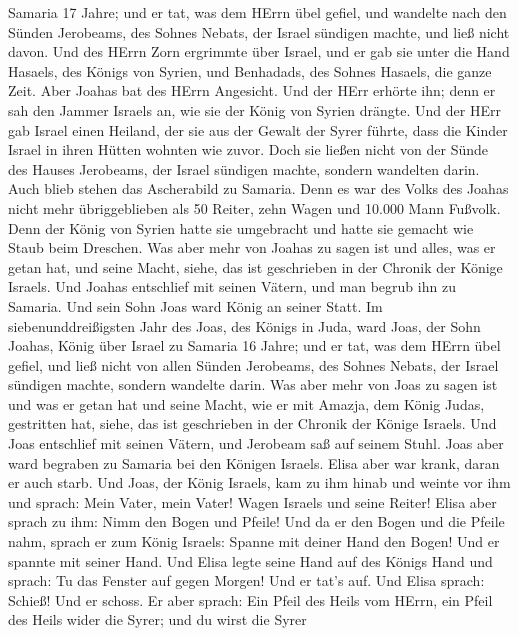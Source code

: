 Samaria 17 Jahre;  und er tat, was dem HErrn übel gefiel,
und wandelte nach den Sünden Jerobeams, des Sohnes Nebats, der Israel
sündigen machte, und ließ nicht davon.  Und des HErrn Zorn
ergrimmte über Israel, und er gab sie unter die Hand Hasaels, des Königs
von Syrien, und Benhadads, des Sohnes Hasaels, die ganze Zeit.
 Aber Joahas bat des HErrn Angesicht. Und der HErr erhörte
ihn; denn er sah den Jammer Israels an, wie sie der König von Syrien
drängte.  Und der HErr gab Israel einen Heiland, der sie aus
der Gewalt der Syrer führte, dass die Kinder Israel in ihren Hütten
wohnten wie zuvor.  Doch sie ließen nicht von der Sünde des
Hauses Jerobeams, der Israel sündigen machte, sondern wandelten darin.
Auch blieb stehen das Ascherabild zu Samaria.  Denn es war
des Volks des Joahas nicht mehr übriggeblieben als 50 Reiter, zehn Wagen
und 10.000 Mann Fußvolk. Denn der König von Syrien hatte sie umgebracht
und hatte sie gemacht wie Staub beim Dreschen.  Was aber
mehr von Joahas zu sagen ist und alles, was er getan hat, und seine
Macht, siehe, das ist geschrieben in der Chronik der Könige Israels.
 Und Joahas entschlief mit seinen Vätern, und man begrub ihn
zu Samaria. Und sein Sohn Joas ward König an seiner Statt. 
Im siebenunddreißigsten Jahr des Joas, des Königs in Juda, ward Joas,
der Sohn Joahas, König über Israel zu Samaria 16 Jahre; 
und er tat, was dem HErrn übel gefiel, und ließ nicht von allen Sünden
Jerobeams, des Sohnes Nebats, der Israel sündigen machte, sondern
wandelte darin.  Was aber mehr von Joas zu sagen ist und
was er getan hat und seine Macht, wie er mit Amazja, dem König Judas,
gestritten hat, siehe, das ist geschrieben in der Chronik der Könige
Israels.  Und Joas entschlief mit seinen Vätern, und
Jerobeam saß auf seinem Stuhl. Joas aber ward begraben zu Samaria bei
den Königen Israels.  Elisa aber war krank, daran er auch
starb. Und Joas, der König Israels, kam zu ihm hinab und weinte vor ihm
und sprach: Mein Vater, mein Vater! Wagen Israels und seine Reiter!
 Elisa aber sprach zu ihm: Nimm den Bogen und Pfeile! Und
da er den Bogen und die Pfeile nahm,  sprach er zum König
Israels: Spanne mit deiner Hand den Bogen! Und er spannte mit seiner
Hand. Und Elisa legte seine Hand auf des Königs Hand  und
sprach: Tu das Fenster auf gegen Morgen! Und er tat's auf. Und Elisa
sprach: Schieß! Und er schoss. Er aber sprach: Ein Pfeil des Heils vom
HErrn, ein Pfeil des Heils wider die Syrer; und du wirst die Syrer
